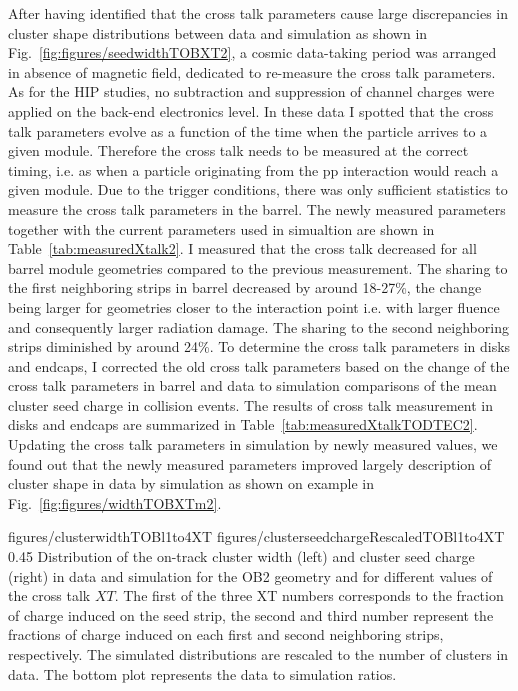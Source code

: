 After having identified that the cross talk parameters cause large discrepancies in cluster shape distributions between data and simulation as shown in Fig.~\ref{fig:figures/seedwidthTOBXT2}, a cosmic data-taking period was arranged in absence of magnetic field, dedicated to re-measure the cross talk parameters. As for the HIP studies, no subtraction and suppression of channel charges were applied on the back-end electronics level. In these data I spotted that the cross talk parameters evolve as a function of the time when the particle arrives to a given module. Therefore the cross talk needs to be measured at the correct timing, i.e. as when a particle originating from the pp interaction would reach a given module. Due to the trigger conditions, there was only sufficient statistics to measure the cross talk parameters in the barrel. The newly measured parameters together with the current parameters used in simualtion are shown in Table~\ref{tab:measuredXtalk2}. I measured that the cross talk decreased for all barrel module geometries compared to the previous measurement. The sharing to the first neighboring strips in barrel decreased by around 18-27\%, the change being larger for geometries closer to the interaction point i.e. with larger fluence and consequently larger radiation damage. The sharing to the second neighboring strips diminished by around 24\%. To determine the cross talk parameters in disks and endcaps, I corrected the old cross talk parameters based on the change of the cross talk parameters in barrel and data to simulation comparisons of the mean cluster seed charge in collision events. The results of cross talk measurement in disks and endcaps are summarized in Table~\ref{tab:measuredXtalkTODTEC2}. Updating the cross talk parameters in simulation by newly measured values, we found out that the newly measured parameters improved largely description of cluster shape in data by simulation as shown on example in Fig.~\ref{fig:figures/widthTOBXTm2}.

                 {figures/clusterwidthTOBl1to4XT}
                 {figures/clusterseedchargeRescaledTOBl1to4XT} %
                 {0.45}       %
                 { Distribution of the on-track cluster width (left) and cluster seed charge (right) in data and simulation for the OB2 geometry and for different values of the cross talk $XT$. The first of the three XT numbers corresponds to the fraction of charge induced on the seed strip, the second and third number represent the fractions of charge induced on each first and second neighboring strips, respectively. The simulated distributions are rescaled to the number of clusters in data. The bottom plot represents the data to simulation ratios. }

